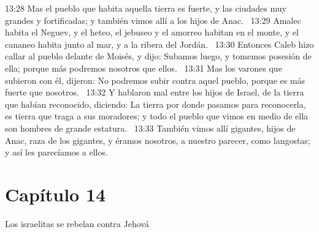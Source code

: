 13:28 Mas el pueblo que habita aquella tierra es fuerte, y las ciudades muy grandes y fortificadas; y también vimos allí a los hijos de Anac.  
13:29 Amalec habita el Neguev, y el heteo, el jebuseo y el amorreo habitan en el monte, y el cananeo habita junto al mar, y a la ribera del Jordán.  
13:30 Entonces Caleb hizo callar al pueblo delante de Moisés, y dijo: Subamos luego, y tomemos posesión de ella; porque más podremos nosotros que ellos.  
13:31 Mas los varones que subieron con él, dijeron: No podremos subir contra aquel pueblo, porque es más fuerte que nosotros.  
13:32 Y hablaron mal entre los hijos de Israel, de la tierra que habían reconocido, diciendo: La tierra por donde pasamos para reconocerla, es tierra que traga a sus moradores; y todo el pueblo que vimos en medio de ella son hombres de grande estatura.  
13:33 También vimos allí gigantes, hijos de Anac, raza de los gigantes, y éramos nosotros, a nuestro parecer, como langostas; y así les parecíamos a ellos.  
\section*{Capítulo 14 }
Los israelitas se rebelan contra Jehová  

